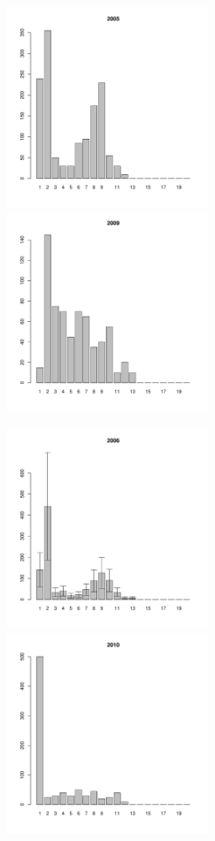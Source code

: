 \documentclass[12pt, a4paper]{article}
\begin{document}
\begin{figure}[h]
\begin{multicols}{3}
\hfill
\includegraphics[width=60mm]{../White_Sea/Luvenga_Goreliy/middle_2005_.pdf}
\hfill
\includegraphics[width=60mm]{../White_Sea/Luvenga_Goreliy/middle_2009_.pdf}
\end{multicols}


\begin{multicols}{3}
\hfill
\includegraphics[width=60mm]{../White_Sea/Luvenga_Goreliy/middle_2006_.pdf}
\hfill
\includegraphics[width=60mm]{../White_Sea/Luvenga_Goreliy/middle_2010_.pdf}
\end{multicols}


\end{figure}
\end{document}
